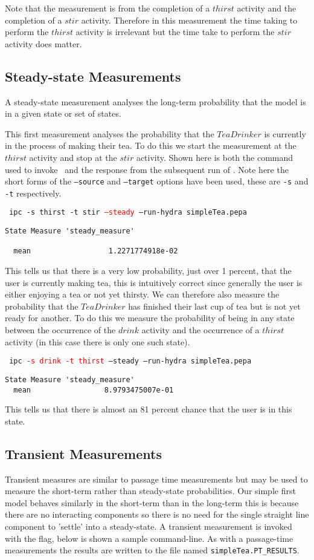 \documentclass[10pt,a4paper]{article}
\begin{document}
Note that the measurement is from the completion of a $thirst$ activity
and the completion of a $stir$ activity. Therefore in this measurement
the time taking to perform the $thirst$ activity is irrelevant but the
time take to perform the $stir$ activity does matter.




\subsection{Steady-state Measurements}
A steady-state measurement analyses the long-term probability that 
the model is in a given state or set of states.

This first measurement analyses the probability that the $TeaDrinker$
is currently in the process of making their tea. To do this we start
the measurement at the $thirst$ activity and stop at the $stir$ activity.
Shown here is both the command used to invoke \ipc\ and the response
from the subsequent run of \hydra.
Note here the short forms of the \texttt{--source} and 
\texttt{--target} options have been used, these are \texttt{-s}
and \texttt{-t} respectively.

\noindent
\texttt{
ipc -s thirst -t stir \textcolor{red}{--steady} --run-hydra simpleTea.pepa
}
\begin{verbatim}
State Measure 'steady_measure'

  mean                  1.2271774918e-02
\end{verbatim}
This tells us that there is a very low probability, just over 1 percent,
that the user is currently making tea, this is intuitively correct since
generally the user is either enjoying a tea or not yet thirsty.
We can therefore also measure the probability that the $TeaDrinker$ has
finished their last cup of tea but is not yet ready for another.
To do this we measure the probability of being in any state between the
occurrence of the $drink$ activity and the occurrence of a $thirst$ activity
(in this case there is only one such state).

\noindent
\texttt{
ipc \textcolor{red}{-s drink -t thirst} --steady --run-hydra simpleTea.pepa
}
\begin{verbatim}
State Measure 'steady_measure'
  mean                 8.9793475007e-01
\end{verbatim}
This tells us that there is almost an 81 percent chance that the user is
in this state.


\subsection{Transient Measurements}
Transient measures are similar to passage time measurements but may be used
to measure the short-term rather than steady-state probabilities.
Our simple first model behaves similarly in the short-term than in the long-term
this is because there are no interacting components so there is no need for
the single straight line component to 'settle' into a steady-state.
A transient measurement is invoked with the  flag, below
is shown a sample command-line.
As with a passage-time measurements the results are written to the file
named \texttt{simpleTea.PT\_RESULTS}.
\end{document}
